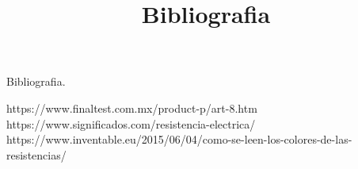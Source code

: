 \documentclass[12pt,a4paper]{report}
\title{Bibliografia}
\begin{document}
	\begin{center}
		\begin{huge}
			Bibliografia.\\
			\vspace*{2cm}
		\end{huge}
	https://www.finaltest.com.mx/product-p/art-8.htm\\
	https://www.significados.com/resistencia-electrica/\\
	https://www.inventable.eu/2015/06/04/como-se-leen-los-colores-de-las-resistencias/\\
	\end{center}

	
\end{document}
